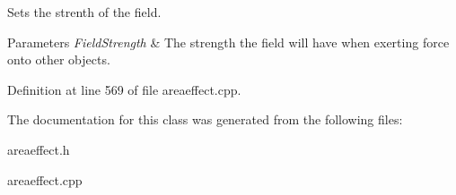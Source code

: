 Sets the strenth of the field. 


\begin{DoxyParams}{Parameters}
{\em FieldStrength} & The strength the field will have when exerting force onto other objects. \\
\hline
\end{DoxyParams}


Definition at line 569 of file areaeffect.cpp.



The documentation for this class was generated from the following files:\begin{DoxyCompactItemize}
\item 
areaeffect.h\item 
areaeffect.cpp\end{DoxyCompactItemize}
